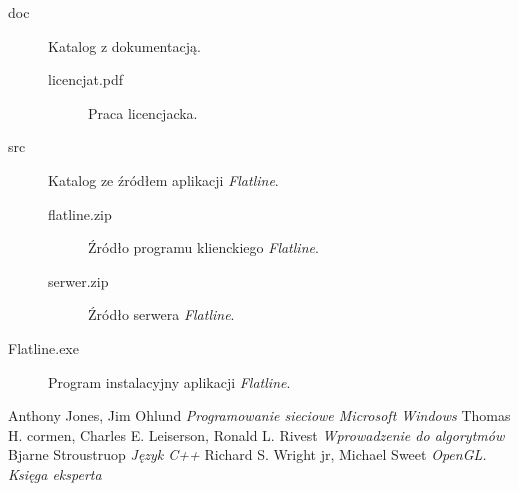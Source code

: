 \documentclass[licencjacka]{pracamgr}
\begin{document}
\begin{description}
\item[doc] Katalog z dokumentacją.
\begin{description}
\item[licencjat.pdf] Praca licencjacka.
\end{description}
\item[src] Katalog ze źródłem aplikacji \emph{Flatline}.
\begin{description}
\item[flatline.zip] Źródło programu klienckiego \emph{Flatline}.
\item[serwer.zip] Źródło serwera \emph{Flatline}.
\end{description}
\item[Flatline.exe] Program instalacyjny aplikacji \emph{Flatline}.
\end{description}

\begin{thebibliography}{99}

 Anthony Jones, Jim Ohlund \textit{Programowanie sieciowe Microsoft Windows}
 Thomas H. cormen, Charles E. Leiserson, Ronald L. Rivest \textit{Wprowadzenie do algorytmów}
 Bjarne Stroustruop \textit{Język C++}
 Richard S. Wright jr, Michael Sweet \textit{OpenGL. Księga eksperta}

\end{thebibliography}
\end{document}
